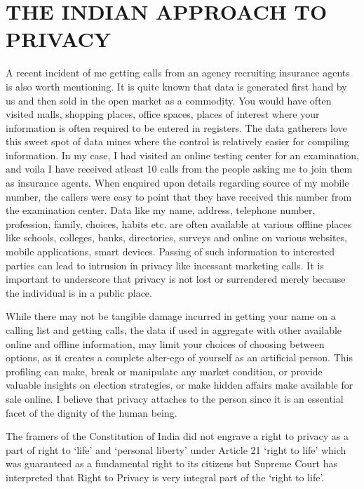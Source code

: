 \begin{multicols}{2}
\begin{itemize}
\end{itemize}

\section{THE INDIAN APPROACH TO\\ PRIVACY}

A recent incident of me getting calls from an agency recruiting insurance agents is also worth mentioning. It is quite known that data is generated first hand by us and then sold in the open market as a commodity. You would have often visited malls, shopping places, office spaces, places of interest where your information is often required to be entered in registers. The data gatherers love this sweet spot of data mines where the control is relatively easier for compiling information. In my case, I had visited an online testing center for an examination, and voila I have received atleast 10 calls from the people asking me to join them as insurance agents. When enquired upon details regarding source of my mobile number, the callers were easy to point that they have received this number from the examination center. Data like my name, address, telephone number, profession, family, choices, habits etc. are often available at various offline places like schools, colleges, banks, directories, surveys and online on various websites, mobile applications, smart devices. Passing of such information to interested parties can lead to intrusion in privacy like incessant marketing calls. It is important to underscore that privacy is not lost or surrendered merely because the individual is in a public place.

While there may not be tangible damage incurred in getting your name on a calling list and getting calls, the data if used in aggregate with other available online and offline information, may limit your choices of choosing between options, as it creates a complete alter-ego of yourself as an artificial person. This profiling can make, break or manipulate any market condition, or provide valuable insights on election strategies, or make hidden affairs make available for sale online. I believe that privacy attaches to the person since it is an essential facet of the dignity of the human being.

The framers of the Constitution of India did not engrave a right to privacy as a part of right to ‘life’ and ‘personal liberty’ under Article 21 ‘right to life’ which was guaranteed as a fundamental right to its citizens but Supreme Court has interpreted that Right to Privacy is very integral part of the ‘right to life’.


\end{multicols}
